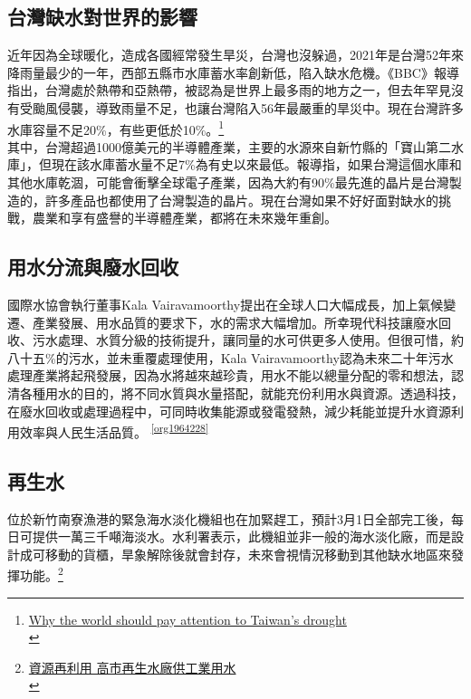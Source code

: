 \documentclass[a4paper,12pt]{article}
\begin{document}
\subsection{台灣缺水對世界的影響}
\label{sec:org7cd26a2}
近年因為全球暖化，造成各國經常發生旱災，台灣也沒躲過，2021年是台灣52年來降雨量最少的一年，西部五縣市水庫蓄水率創新低，陷入缺水危機。《BBC》報導 指出，台灣處於熱帶和亞熱帶，被認為是世界上最多雨的地方之一，但去年罕見沒有受颱風侵襲，導致雨量不足，也讓台灣陷入56年最嚴重的旱災中。現在台灣許多水庫容量不足20\%，有些更低於10\%。\footnote{\href{https://www.bbc.com/news/world-asia-56798308}{Why the world should pay attention to Taiwan's drought}\\}\\

其中，台灣超過1000億美元的半導體產業，主要的水源來自新竹縣的「寶山第二水庫」，但現在該水庫蓄水量不足7\%為有史以來最低。報導指，如果台灣這個水庫和其他水庫乾涸，可能會衝擊全球電子產業，因為大約有90\%最先進的晶片是台灣製造的，許多產品也都使用了台灣製造的晶片。現在台灣如果不好好面對缺水的挑戰，農業和享有盛譽的半導體產業，都將在未來幾年重創。\\

\subsection{用水分流與廢水回收}
\label{sec:orga8f2cc0}
國際水協會執行董事Kala Vairavamoorthy提出在全球人口大幅成長，加上氣候變遷、產業發展、用水品質的要求下，水的需求大幅增加。所幸現代科技讓廢水回收、污水處理、水質分級的技術提升，讓同量的水可供更多人使用。但很可惜，約八十五\%的污水，並未重覆處理使用，Kala Vairavamoorthy認為未來二十年污水處理產業將起飛發展，因為水將越來越珍貴，用水不能以總量分配的零和想法，認清各種用水的目的，將不同水質與水量搭配，就能充份利用水與資源。透過科技，在廢水回收或處理過程中，可同時收集能源或發電發熱，減少耗能並提升水資源利用效率與人民生活品質。 \textsuperscript{\ref{org1964228}}\\

\subsection{再生水}
\label{sec:orge9ffbb7}
位於新竹南寮漁港的緊急海水淡化機組也在加緊趕工，預計3月1日全部完工後，每日可提供一萬三千噸海淡水。水利署表示，此機組並非一般的海水淡化廠，而是設計成可移動的貨櫃，旱象解除後就會封存，未來會視情況移動到其他缺水地區來發揮功能。\footnote{\href{https://news.pts.org.tw/article/505049}{資源再利用 高市再生水廠供工業用水}\\\label{org98da124}}\\
\end{document}
